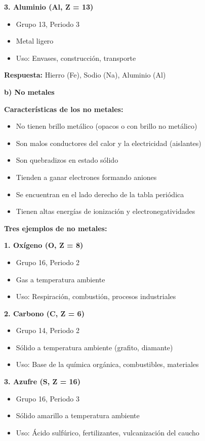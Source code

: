 \begin{exercise}
\begin{solu}
        \textbf{3. Aluminio (Al, Z = 13)}
        \begin{itemize}
            \item Grupo 13, Periodo 3
            \item Metal ligero
            \item Uso: Envases, construcción, transporte
        \end{itemize}

        \textbf{Respuesta:} Hierro (Fe), Sodio (Na), Aluminio (Al)

        \textbf{b) No metales}

        \textbf{Características de los no metales:}
        \begin{itemize}
            \item No tienen brillo metálico (opacos o con brillo no metálico)
            \item Son malos conductores del calor y la electricidad (aislantes)
            \item Son quebradizos en estado sólido
            \item Tienden a ganar electrones formando aniones
            \item Se encuentran en el lado derecho de la tabla periódica
            \item Tienen altas energías de ionización y electronegatividades
        \end{itemize}

        \textbf{Tres ejemplos de no metales:}

        \textbf{1. Oxígeno (O, Z = 8)}
        \begin{itemize}
            \item Grupo 16, Periodo 2
            \item Gas a temperatura ambiente
            \item Uso: Respiración, combustión, procesos industriales
        \end{itemize}

        \textbf{2. Carbono (C, Z = 6)}
        \begin{itemize}
            \item Grupo 14, Periodo 2
            \item Sólido a temperatura ambiente (grafito, diamante)
            \item Uso: Base de la química orgánica, combustibles, materiales
        \end{itemize}

        \textbf{3. Azufre (S, Z = 16)}
        \begin{itemize}
            \item Grupo 16, Periodo 3
            \item Sólido amarillo a temperatura ambiente
            \item Uso: Ácido sulfúrico, fertilizantes, vulcanización del caucho
        \end{itemize}


\end{solu}
\end{exercise}
